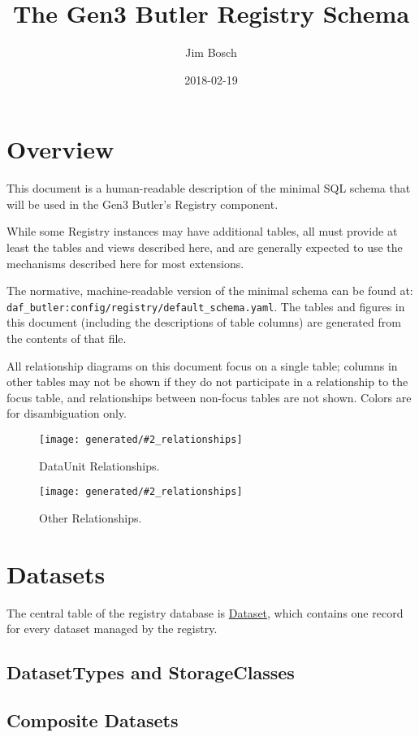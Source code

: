 \documentclass[DM,toc]{lsstdoc}
\title{The Gen3 Butler Registry Schema}
\author{Jim Bosch}
\date{2018-02-19}
\newcommand{\tblref}[1]{\hyperref[tbl:#1]{#1}}
\newcommand{\coltable}[1]{
    \begin{table}
        {\footnotesize
        }
        \caption{#1 Columns}
        \label{tbl:#1}
    \end{table}
}
\newcommand{\relgraph}[2][width=0.8\textwidth]{
    \begin{figure}
        \centering
        \texttt{[image: generated/\#2\_relationships]}
        \caption{#2 Relationships.}
        \label{rel:#2}
    \end{figure}
}
\begin{document}
\maketitle

\section{Overview}
\label{sec:overview}

This document is a human-readable description of the minimal SQL schema that will be used in the Gen3 Butler's Registry component.

While some Registry instances may have additional tables, all must provide at least the tables and views described here, and are generally expected to use the mechanisms described here for most extensions.

The normative, machine-readable version of the minimal schema can be found at: \verb`daf_butler:config/registry/default_schema.yaml`.
The tables and figures in this document (including the descriptions of table columns) are generated from the contents of that file.

All relationship diagrams on this document focus on a single table; columns in other tables may not be shown if they do not participate in a relationship to the focus table, and relationships between non-focus tables are not shown.  Colors are for disambiguation only.

\relgraph[width=0.8\textwidth]{DataUnit}
\relgraph[height=0.8\textheight]{Other}

\section{Datasets}
\label{sec:datasets}

The central table of the registry database is \tblref{Dataset}, which contains one record for every dataset managed by the registry.

\coltable{Dataset}


\subsection{DatasetTypes and StorageClasses}
\label{sec:datasettypes-and-storageclasses}

\coltable{DatasetType}

\coltable{DatasetTypeUnits}
\coltable{DatasetTypeMetadata}

\subsection{Composite Datasets}
\label{sec:composite-datasets}
\end{document}
